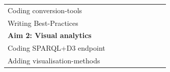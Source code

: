 \documentclass[twoside,fontsize=10pt]{article}
\begin{document}
\begin{table}[h]
\begin{center}
\begin{tabular}{lllllllll}
\hspace*{1em} Coding conversion-tools           &                                                 & \cellcolor[HTML]{656565}                        & \cellcolor[HTML]{656565}                        &                                                 &                                                 &                                                 &                                                 &                                                 \\
\hspace*{1em} Writing Best-Practices            &                                                 &                                                 & \cellcolor[HTML]{656565}                        &                                                 &                                                 &                                                 &                                                 &                                                 \\
\textbf{Aim 2: Visual analytics}                &                                                 &                                                 & \cellcolor[HTML]{343434}                        & \cellcolor[HTML]{343434}                        &                         \cellcolor[HTML]{343434}                                               &                                                 &                                                 &                                                 \\
\hspace*{1em} Coding SPARQL+D3 endpoint         &                                                 &                                                 & \cellcolor[HTML]{656565}                        &                                                 &                                                 &                                                 &                                                 &                                                 \\
\hspace*{1em} Adding visualisation-methods      &                                                 &                                                 & \cellcolor[HTML]{656565}                        & \cellcolor[HTML]{656565}                        &                                                 &                                                 &                                                 &                                                 \\

\end{tabular}
\end{center}
\end{table}
\end{document}
